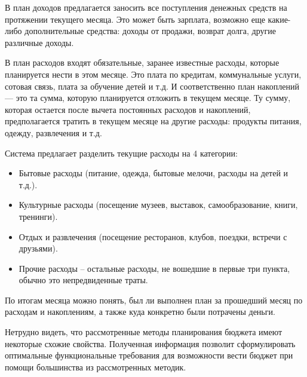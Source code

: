 В план доходов предлагается заносить все поступления денежных средств на протяжении текущего месяца.
Это может быть зарплата, возможно еще какие-либо дополнительные средства: доходы от продажи, возврат долга, другие различные доходы.

В план расходов входят обязательные, заранее известные расходы, которые планируется нести в этом месяце.
Это плата по кредитам, коммунальные услуги, сотовая связь, плата за обучение детей и т.д.
И соответственно план накоплений — это та сумма, которую планируется отложить в текущем месяце.
Ту сумму, которая остается после вычета постоянных расходов и накоплений, предполагается тратить в текущем месяце на другие расходы: продукты питания, одежду, развлечения и т.д.

Система предлагает разделить текущие расходы на 4 категории:
\begin{itemize}
    \item Бытовые расходы (питание, одежда, бытовые мелочи, расходы на детей и т.д.).
    \item Культурные расходы (посещение музеев, выставок, самообразование, книги, тренинги).
    \item Отдых и развлечения (посещение ресторанов, клубов, поездки, встречи с друзьями).
    \item Прочие расходы -- остальные расходы, не вошедшие в первые три пункта, обычно это непредвиденные траты.
\end{itemize}

По итогам месяца можно понять, был ли выполнен план за прошедший месяц по расходам и накоплениям, а также куда конкретно были потрачены деньги.

Нетрудно видеть, что рассмотренные методы планирования бюджета имеют некоторые схожие свойства.
Полученная информация позволит сформулировать оптимальные функциональные требования для возможности вести бюджет при помощи большинства из рассмотренных методик.